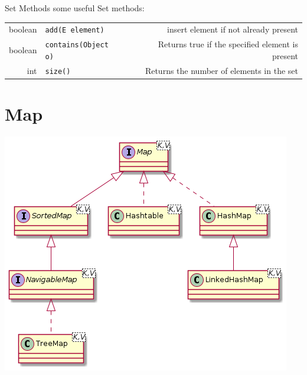 	\begin{frame}[fragile]{Set Methods}
		some useful Set methods:\\
		\vspace{1em}
		\begin{tabular}{ r l r }
			boolean & \texttt{add(E element)}
			& \footnotesize{insert element if not already present} \\
			boolean &\texttt{contains(Object o)}
			& \footnotesize{Returns true if the specified element is present} \\
			int &\texttt{size()}
			& \footnotesize{Returns the number of elements in the set} \\
		\end{tabular}
	
	\end{frame}
	
\section{Map}
	\begin{frame}
		\begin{center}
			\includegraphics[scale=.5]{08_set_map/maps.png}
		\end{center}
		
	\end{frame}

